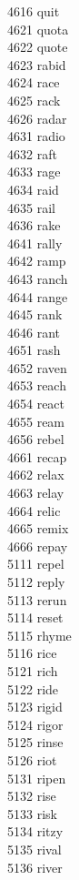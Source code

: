 4616 quit \\
4621 quota \\
4622 quote \\
4623 rabid \\
4624 race \\
4625 rack \\
4626 radar \\
4631 radio \\
4632 raft \\
4633 rage \\
4634 raid \\
4635 rail \\
4636 rake \\
4641 rally \\
4642 ramp \\
4643 ranch \\
4644 range \\
4645 rank \\
4646 rant \\
4651 rash \\
4652 raven \\
4653 reach \\
4654 react \\
4655 ream \\
4656 rebel \\
4661 recap \\
4662 relax \\
4663 relay \\
4664 relic \\
4665 remix \\
4666 repay \\
5111 repel \\
5112 reply \\
5113 rerun \\
5114 reset \\
5115 rhyme \\
5116 rice \\
5121 rich \\
5122 ride \\
5123 rigid \\
5124 rigor \\
5125 rinse \\
5126 riot \\
5131 ripen \\
5132 rise \\
5133 risk \\
5134 ritzy \\
5135 rival \\
5136 river \\

